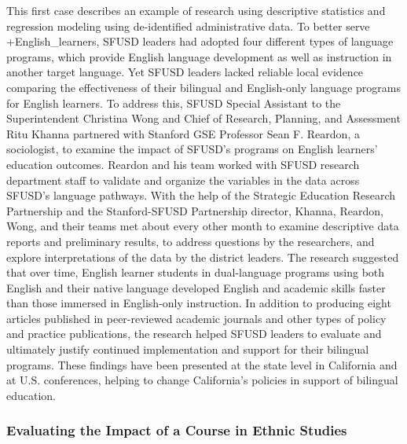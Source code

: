\documentclass[
]{book}
\begin{document}
This first case describes an example of research using descriptive statistics and regression modeling using de-identified administrative data. To better serve +English\_learners\textbar, SFUSD leaders had adopted four different types of language programs, which provide English language development as well as instruction in another target language. Yet SFUSD leaders lacked reliable local evidence comparing the effectiveness of their bilingual and English-only language programs for English learners. To address this, SFUSD Special Assistant to the Superintendent Christina Wong and Chief of Research, Planning, and Assessment Ritu Khanna partnered with Stanford GSE Professor Sean F. Reardon, a sociologist, to examine the impact of SFUSD's programs on English learners' education outcomes. Reardon and his team worked with SFUSD research department staff to validate and organize the variables in the data across SFUSD's language pathways. With the help of the Strategic Education Research Partnership and the Stanford-SFUSD Partnership director, Khanna, Reardon, Wong, and their teams met about every other month to examine descriptive data reports and preliminary results, to address questions by the researchers, and explore interpretations of the data by the district leaders. The research suggested that over time, English learner students in dual-language programs using both English and their native language developed English and academic skills faster than those immersed in English-only instruction. In addition to producing eight articles published in peer-reviewed academic journals and other types of policy and practice publications, the research helped SFUSD leaders to evaluate and ultimately justify continued implementation and support for their bilingual programs. These findings have been presented at the state level in California and at U.S. conferences, helping to change California's policies in support of bilingual education.

\hypertarget{evaluating-the-impact-of-a-course-in-ethnic-studies}{%
\subsubsection*{Evaluating the Impact of a Course in Ethnic Studies}\label{evaluating-the-impact-of-a-course-in-ethnic-studies}}
\end{document}
